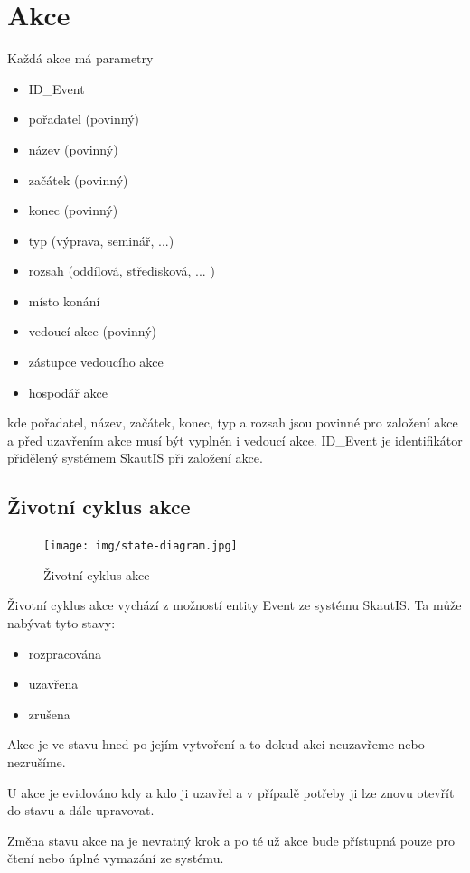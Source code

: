 \documentclass[thesis=B,czech]{FITthesis}[2011/06/14]
\begin{document}
\section{Akce}
\label{sec:eventDescription}
Každá akce má parametry
\begin{itemize}
	\item ID\_Event
	\item pořadatel (povinný)
	\item název (povinný) 
	\item začátek (povinný)
	\item konec (povinný)
	\item typ (výprava, seminář, ...)
	\item rozsah (oddílová, středisková, ... )
	\item místo konání
	\item vedoucí akce (povinný)
	\item zástupce vedoucího akce
	\item hospodář akce
\end{itemize}
kde pořadatel, název, začátek, konec, typ a rozsah jsou povinné pro založení akce a před uzavřením akce musí být vyplněn i vedoucí akce. ID\_Event je identifikátor přidělený systémem SkautIS při založení akce.

\subsection{Životní cyklus akce}
 \begin{figure}[h] \centering
 	\texttt{[image: img/state-diagram.jpg]}
 	\caption[Životní cyklus akce]{Životní cyklus akce}\label{fig:state-diagram}
 \end{figure}
 Životní cyklus akce vychází z možností entity Event ze systému SkautIS. Ta může nabývat tyto stavy:
 
 \begin{itemize}
 	\item rozpracována
	\item uzavřena
	\item zrušena
 \end{itemize} 
 
Akce je ve stavu  hned po jejím vytvoření a to dokud akci neuzavřeme nebo nezrušíme.

U  akce je evidováno kdy a kdo ji uzavřel a v případě potřeby ji lze znovu otevřít do stavu  a dále upravovat.

Změna stavu akce na  je nevratný krok a po té už akce bude přístupná pouze pro čtení nebo úplné vymazání ze systému.
\end{document}
